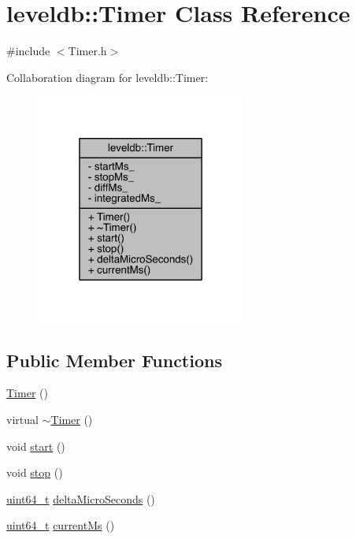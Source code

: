 \hypertarget{classleveldb_1_1_timer}{}\section{leveldb\+:\+:Timer Class Reference}
\label{classleveldb_1_1_timer}


{\ttfamily \#include $<$Timer.\+h$>$}



Collaboration diagram for leveldb\+:\+:Timer\+:
\nopagebreak
\begin{figure}[H]
\begin{center}
\leavevmode
\includegraphics[width=196pt]{classleveldb_1_1_timer__coll__graph}
\end{center}
\end{figure}
\subsection*{Public Member Functions}
\begin{DoxyCompactItemize}
\item 
\hyperlink{classleveldb_1_1_timer_a5f16e8da27d2a5a5242dead46de05d97}{Timer} ()
\item 
virtual \hyperlink{classleveldb_1_1_timer_a14fa469c4c295c5fa6e66a4ad1092146}{$\sim$\+Timer} ()
\item 
void \hyperlink{classleveldb_1_1_timer_a3a8b5272198d029779dc9302a54305a8}{start} ()
\item 
void \hyperlink{classleveldb_1_1_timer_a63f0eb44b27402196590a03781515dba}{stop} ()
\item 
\hyperlink{stdint_8h_aaa5d1cd013383c889537491c3cfd9aad}{uint64\+\_\+t} \hyperlink{classleveldb_1_1_timer_ac08eb913bfbb1742508e8f4cab06d072}{delta\+Micro\+Seconds} ()
\item 
\hyperlink{stdint_8h_aaa5d1cd013383c889537491c3cfd9aad}{uint64\+\_\+t} \hyperlink{classleveldb_1_1_timer_a6abd6fd3e6cd611e6f48ad3a65fba417}{current\+Ms} ()
\end{DoxyCompactItemize}
